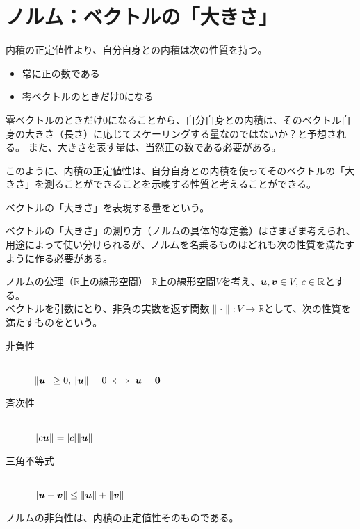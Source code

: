 \documentclass[../../../topic_linear-algebra]{subfiles}
\begin{document}
\sectionline
\section{ノルム：ベクトルの「大きさ」}

内積の正定値性より、自分自身との内積は次の性質を持つ。
\begin{itemize}
  \item 常に正の数である
  \item 零ベクトルのときだけ0になる
\end{itemize}

零ベクトルのときだけ0になることから、自分自身との内積は、そのベクトル自身の大きさ（長さ）に応じてスケーリングする量なのではないか？と予想される。
また、大きさを表す量は、当然正の数である必要がある。

\br

このように、内積の正定値性は、自分自身との内積を使ってそのベクトルの「大きさ」を測ることができることを示唆する性質と考えることができる。

\br

ベクトルの「大きさ」を表現する量をという。

\br

ベクトルの「大きさ」の測り方（ノルムの具体的な定義）はさまざま考えられ、用途によって使い分けられるが、ノルムを名乗るものはどれも次の性質を満たすように作る必要がある。

\begin{definition}{ノルムの公理（$\mathbb{R}$上の線形空間）}\label{def:norm-axioms}
  $\mathbb{R}$上の線形空間$V$を考え、$\vb*{u}, \vb*{v} \in V,\, c \in \mathbb{R} $とする。\\
  ベクトルを引数にとり、非負の実数を返す関数$\|\cdot\|: V \to \mathbb{R}$として、次の性質を満たすものをという。
  \begin{description}
    \item[非負性]~\\
          $\|\vb*{u}\| \geq 0, \|\vb*{u}\| = 0 \iff \vb*{u} = \vb*{0}$
    \item[斉次性]~\\
          $\|c\vb*{u}\| = |c|\|\vb*{u}\|$
    \item[三角不等式]~\\
          $\|\vb*{u} + \vb*{v}\| \leq \|\vb*{u}\| + \|\vb*{v}\|$
  \end{description}
\end{definition}

ノルムの非負性は、内積の正定値性そのものである。
\end{document}
